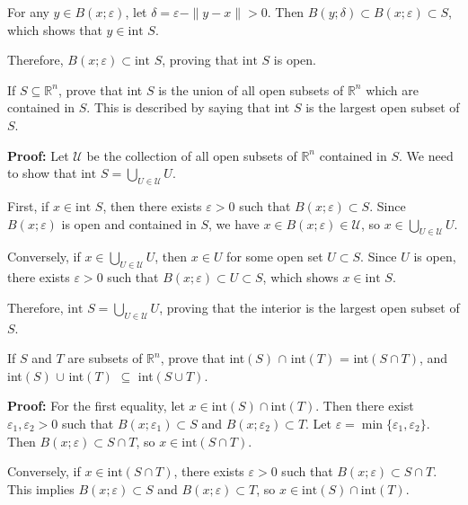 For any $y \in B(x;\varepsilon)$, let $\delta = \varepsilon - \|y-x\| > 0$. Then $B(y;\delta) \subset B(x;\varepsilon) \subset S$, which shows that $y \in \text{int } S$.

Therefore, $B(x;\varepsilon) \subset \text{int } S$, proving that $\text{int } S$ is open.

\begin{problembox}
If $S \subseteq \mathbb{R}^n$, prove that int $S$ is the union of all open subsets of $\mathbb{R}^n$ which are contained in $S$. This is described by saying that int $S$ is the largest open subset of $S$.
\end{problembox}

\textbf{Proof:} Let $\mathcal{U}$ be the collection of all open subsets of $\mathbb{R}^n$ contained in $S$. We need to show that $\text{int } S = \bigcup_{U \in \mathcal{U}} U$.

First, if $x \in \text{int } S$, then there exists $\varepsilon > 0$ such that $B(x;\varepsilon) \subset S$. Since $B(x;\varepsilon)$ is open and contained in $S$, we have $x \in B(x;\varepsilon) \in \mathcal{U}$, so $x \in \bigcup_{U \in \mathcal{U}} U$.

Conversely, if $x \in \bigcup_{U \in \mathcal{U}} U$, then $x \in U$ for some open set $U \subset S$. Since $U$ is open, there exists $\varepsilon > 0$ such that $B(x;\varepsilon) \subset U \subset S$, which shows $x \in \text{int } S$.

Therefore, $\text{int } S = \bigcup_{U \in \mathcal{U}} U$, proving that the interior is the largest open subset of $S$.

\begin{problembox}
If $S$ and $T$ are subsets of $\mathbb{R}^n$, prove that
int$(S)$ $\cap$ int$(T)$ = int$(S \cap T)$,
and int$(S)$ $\cup$ int$(T)$ $\subseteq$ int$(S \cup T)$.
\end{problembox}    

\textbf{Proof:} For the first equality, let $x \in \text{int}(S) \cap \text{int}(T)$. Then there exist $\varepsilon_1, \varepsilon_2 > 0$ such that $B(x;\varepsilon_1) \subset S$ and $B(x;\varepsilon_2) \subset T$. Let $\varepsilon = \min\{\varepsilon_1, \varepsilon_2\}$. Then $B(x;\varepsilon) \subset S \cap T$, so $x \in \text{int}(S \cap T)$.

Conversely, if $x \in \text{int}(S \cap T)$, there exists $\varepsilon > 0$ such that $B(x;\varepsilon) \subset S \cap T$. This implies $B(x;\varepsilon) \subset S$ and $B(x;\varepsilon) \subset T$, so $x \in \text{int}(S) \cap \text{int}(T)$.

